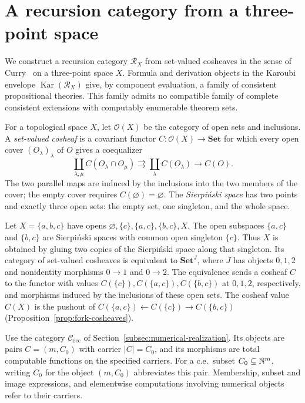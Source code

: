 \section{A recursion category from a three-point space}\label{sec:cosheaves}

We construct a recursion category $\mathscr R_X$ from set-valued
cosheaves in the sense of Curry~\cite[Definition~2.6]{CurryCosheaves}
on a three-point space $X$. Formula and derivation objects in the Karoubi
envelope $\operatorname{Kar}(\mathscr R_X)$
give, by component evaluation, a family of consistent propositional
theories. This family admits no compatible family of complete consistent
extensions with computably enumerable theorem sets.

For a topological space $X$, let $\mathcal O(X)$ be the category
of open sets and inclusions. A \emph{set-valued cosheaf} is a
covariant functor $C:\mathcal O(X)\to\mathbf{Set}$ for which
every open cover $(O_\lambda)_\lambda$ of $O$ gives a coequalizer
\[
 \coprod_{\lambda,\mu} C(O_\lambda\cap O_\mu)
 \rightrightarrows \coprod_\lambda C(O_\lambda)
 \longrightarrow C(O).
\]
The two parallel maps are induced by the inclusions into the two
members of the cover; the empty cover requires
$C(\varnothing)=\varnothing$.
The \emph{Sierpi\'nski space} has two points and exactly three open
sets: the empty set, one singleton, and the whole space.

Let $X=\{a,b,c\}$ have opens
$\varnothing,\{c\},\{a,c\},\{b,c\},X$.
The open subspaces $\{a,c\}$ and $\{b,c\}$ are Sierpi\'nski spaces
with common open singleton $\{c\}$. Thus $X$ is obtained by gluing
two copies of the Sierpi\'nski space along that singleton.
Its category of set-valued cosheaves is equivalent to
$\mathbf{Set}^{J}$, where $J$ has objects $0,1,2$ and nonidentity
morphisms $0\to1$ and $0\to2$.
The equivalence sends a cosheaf $C$ to the functor with values
$C(\{c\}),C(\{a,c\}),C(\{b,c\})$ at $0,1,2$, respectively,
and morphisms induced by the inclusions of these open sets.
The cosheaf value $C(X)$ is the pushout of
$C(\{a,c\})\leftarrow C(\{c\})\to C(\{b,c\})$
(Proposition~\ref{prop:fork-cosheaves}).

Use the category $\mathcal C_{\mathrm{rec}}$ of
Section~\ref{subsec:numerical-realization}. Its objects are pairs
$C=(m,C_0)$ with carrier $|C|=C_0$, and its morphisms are total
computable functions on the specified carriers. For a c.e.\ subset
$C_0\subseteq\mathbb N^m$, writing $C_0$ for the object $(m,C_0)$
abbreviates this pair. Membership, subset and image expressions,
and elementwise computations involving numerical objects refer
to their carriers.

